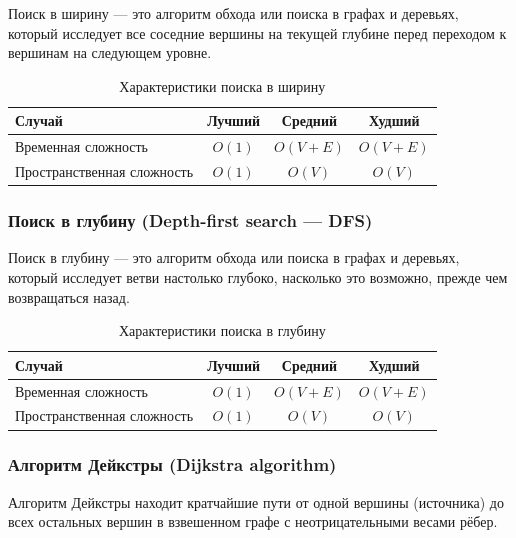 \documentclass[a4paper,12pt]{article}
\begin{document}
Поиск в ширину --- это алгоритм обхода или поиска в графах и деревьях, который исследует все соседние вершины на текущей глубине перед переходом к вершинам на следующем уровне.

\begin{table}[H]
    \centering
    \begin{tabular}{|l|c|c|c|}
        \hline
        Случай & Лучший & Средний & Худший \\
        \hline
        Временная сложность & $O(1)$ & $O(V + E)$ & $O(V + E)$ \\
        \hline
        Пространственная сложность & $O(1)$ & $O(V)$ & $O(V)$ \\
        \hline
    \end{tabular}
    \caption{Характеристики поиска в ширину}
\end{table}

\subsubsection{Поиск в глубину (Depth-first search — DFS)}
\label{subsubsec:поиск-в-глубину-depth-first-search-dfs}

Поиск в глубину --- это алгоритм обхода или поиска в графах и деревьях, который исследует ветви настолько глубоко, насколько это возможно, прежде чем возвращаться назад.

\begin{table}[H]
    \centering
    \begin{tabular}{|l|c|c|c|}
        \hline
        Случай & Лучший & Средний & Худший \\
        \hline
        Временная сложность & $O(1)$ & $O(V + E)$ & $O(V + E)$ \\
        \hline
        Пространственная сложность & $O(1)$ & $O(V)$ & $O(V)$ \\
        \hline
    \end{tabular}
    \caption{Характеристики поиска в глубину}
\end{table}

\subsubsection{Алгоритм Дейкстры (Dijkstra algorithm)}
\label{subsubsec:алгоритм-дейкстры-dijkstra-algorithm}

Алгоритм Дейкстры находит кратчайшие пути от одной вершины (источника) до всех остальных вершин в взвешенном графе с неотрицательными весами рёбер.
\end{document}

